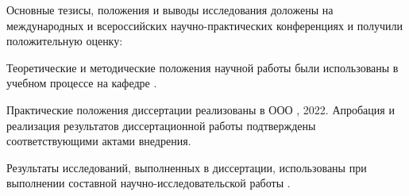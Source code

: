 
Основные тезисы, положения и выводы исследования доложены на международных и всероссийских научно-практических конференциях и получили положительную оценку:


Теоретические и методические положения научной работы были использованы в учебном процессе на кафедре .

Практические положения диссертации реализованы в ООО , 2022. Апробация и реализация результатов диссертационной работы подтверждены соответствующими актами внедрения.

Результаты исследований, выполненных в диссертации, использованы при выполнении составной научно-исследовательской работы .